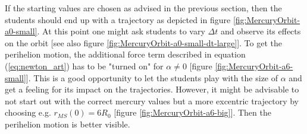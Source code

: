 \documentclass[12pt,ngerman,american]{iopart}
\begin{document}
If the starting values are chosen as advised in the previous section, then the students should end up with a trajectory as depicted in figure \ref{fig:MercuryOrbit-a0-small}.
At this point one might ask students to vary $\Delta t$ and observe its effects on the orbit [see also figure \ref{fig:MercuryOrbit-a0-small-dt-large}].
To get the perihelion motion, the additional force term described in equation (\ref{eq:newton_art}) has to be "turned on" for $\alpha\neq0$ [figure \ref{fig:MercuryOrbit-a6-small}].
This is a good opportunity to let the students play with the size of $\alpha$ and get a feeling for its impact on the trajectories.
However, it might be advisable to not start out with the correct mercury values but a more excentric trajectory by choosing e.g. $r_{MS}(0)=6R_0$ [figure \ref{fig:MercuryOrbit-a6-big}].
Then the perihelion motion is better visible.
\end{document}
